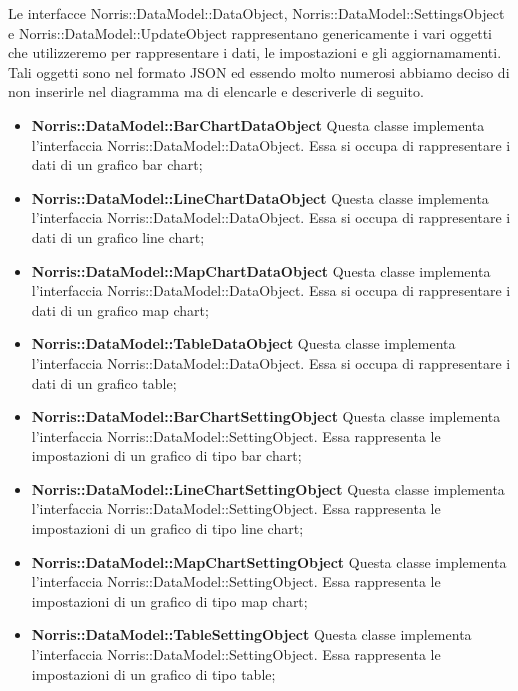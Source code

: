 	Le interfacce Norris::DataModel::DataObject, Norris::DataModel::SettingsObject e Norris::DataModel::UpdateObject rappresentano genericamente i vari oggetti che utilizzeremo per rappresentare i dati, le impostazioni e gli aggiornamamenti. Tali oggetti sono nel formato JSON ed essendo molto numerosi abbiamo deciso di non inserirle nel diagramma ma di elencarle e descriverle di seguito.

	\begin{itemize}
		\item \textbf{Norris::DataModel::BarChartDataObject} Questa classe implementa l'interfaccia Norris::DataModel::DataObject. Essa si occupa di rappresentare i dati di un grafico bar chart;

		\item \textbf{Norris::DataModel::LineChartDataObject} Questa classe implementa l'interfaccia Norris::DataModel::DataObject. Essa si occupa di rappresentare i dati di un grafico line chart;

		\item \textbf{Norris::DataModel::MapChartDataObject} Questa classe implementa l'interfaccia Norris::DataModel::DataObject. Essa si occupa di rappresentare i dati di un grafico map chart;

		\item \textbf{Norris::DataModel::TableDataObject} Questa classe implementa l'interfaccia Norris::DataModel::DataObject. Essa si occupa di rappresentare i dati di un grafico table;

		\item \textbf{Norris::DataModel::BarChartSettingObject} Questa classe implementa l'interfaccia Norris::DataModel::SettingObject. Essa rappresenta le impostazioni di un grafico di tipo bar chart;

		\item \textbf{Norris::DataModel::LineChartSettingObject} Questa classe implementa l'interfaccia Norris::DataModel::SettingObject. Essa rappresenta le impostazioni di un grafico di tipo line chart;

		\item \textbf{Norris::DataModel::MapChartSettingObject} Questa classe implementa l'interfaccia Norris::DataModel::SettingObject. Essa rappresenta le impostazioni di un grafico di tipo map chart;

		\item \textbf{Norris::DataModel::TableSettingObject} Questa classe implementa l'interfaccia Norris::DataModel::SettingObject. Essa rappresenta le impostazioni di un grafico di tipo table;


\end{itemize}
